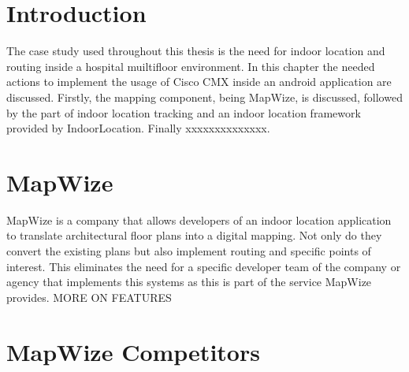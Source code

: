 \section{Introduction}
The case study used throughout this thesis is the need for indoor location and routing inside a hospital muiltifloor environment. In this chapter the needed actions to implement the usage of Cisco CMX inside an android application are discussed. Firstly, the mapping component, being MapWize, is discussed, followed by the part of indoor location tracking and an indoor location framework provided by IndoorLocation. Finally xxxxxxxxxxxxxx.
\section{MapWize}
MapWize is a company that allows developers of an indoor location application to translate architectural floor plans into a digital mapping. Not only do they convert the existing plans but also implement routing and specific points of interest. This eliminates the need for a specific developer team of the company or agency that implements this systems as this is part of the service MapWize provides.
MORE ON FEATURES
\section{MapWize Competitors}
